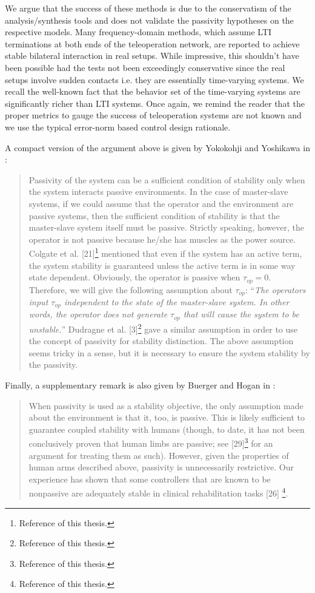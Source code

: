 We argue that the success of these methods is due to the conservatism of the analysis/synthesis tools and does not validate the 
passivity hypotheses on the respective models. Many frequency-domain methods, which assume LTI terminations at both ends of the 
teleoperation network, are reported to achieve stable bilateral interaction in real setups. While impressive, this shouldn't have 
been possible had the tests not been exceedingly conservative since the real setups involve sudden contacts i.e. they are essentially 
time-varying systems. We recall the well-known fact that the behavior set of the time-varying systems are significantly richer than 
LTI systems. Once again, we remind the reader that the proper metrics to gauge the success of teleoperation systems are not known and 
we use the typical error-norm based control design rationale. 

A compact version of the argument above is given by Yokokohji and Yoshikawa in \cite{yokokohjiyoshikawa}: 
\begin{quote}
Passivity of the system can be a
sufficient condition of stability only when the system interacts
passive environments. In the case of master-slave systems, if
we could assume that the operator and the environment are
passive systems, then the sufficient condition of stability is
that the master-slave system itself must be passive. Strictly
speaking, however, the operator is not passive because he/she
has muscles as the power source. Colgate et al. [21]\footnote{Reference 
\cite{colgatehogan88} of this thesis.} mentioned
that even if the system has an active term, the system stability
is guaranteed unless the active term is in some way state dependent.
Obviously, the operator is passive when $\tau_{op}= 0$.
Therefore, we will give the following assumption about $\tau_{op}$:
\enquote{\emph{The operators input $\tau_{op}$ independent to the state of the
master-slave system. In other words, the operator does not
generate $\tau_{op}$ that will cause the system to be unstable.}}
Dudragne et al. [3]\footnote{Reference \cite{dudragne} of this thesis.} gave a similar assumption in order to use
the concept of passivity for stability distinction. The above
assumption seems tricky in a sense, but it is necessary to ensure
the system stability by the passivity.
\end{quote}

\noindent Finally, a supplementary remark is also given by Buerger and Hogan in \cite{buergerhogan1}: 
\begin{quote}
When passivity is used as a stability objective, the only assumption
made about the environment is that it, too, is passive.
This is likely sufficient to guarantee coupled stability with humans
(though, to date, it has not been conclusively proven that
human limbs are passive; see [29]\footnote{Reference \cite{hogan89} 
of this thesis.} for an argument for treating them as such). However, 
given the properties of human arms 
described above, passivity is unnecessarily restrictive. Our experience
has shown that some controllers that are known to be
nonpassive are adequately stable in clinical rehabilitation tasks [26]%
\footnote{Reference \cite{buergerconf} of this thesis.}.
\end{quote}


